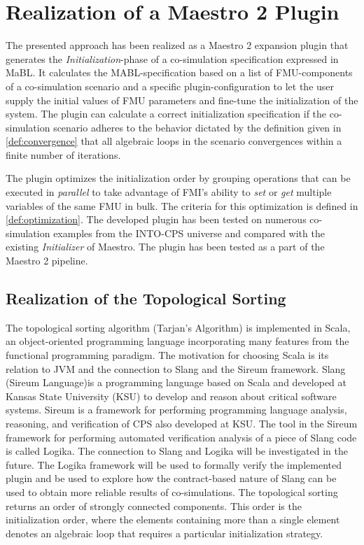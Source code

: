 \section{Realization of a Maestro 2 Plugin}\label{sc:implementation}
The presented approach has been realized as a Maestro 2 expansion plugin that generates the \textit{Initialization}-phase of a co-simulation specification expressed in MaBL. It calculates the MABL-specification based on a list of FMU-components of a co-simulation scenario and a specific plugin-configuration to let the user supply the initial values of  FMU parameters and fine-tune the initialization of the system. The plugin can calculate a correct initialization specification if the co-simulation scenario adheres to the behavior dictated by the definition given in \cref{def:convergence} that all algebraic loops in the scenario convergences within a finite number of iterations.

The plugin optimizes the initialization order by grouping operations that can be executed in \textit{parallel} to take advantage of FMI's ability to \textit{set} or \textit{get} multiple variables of the same FMU in bulk. The criteria for this optimization is defined in \cref{def:optimization}. 
The developed plugin has been tested on numerous co-simulation examples from the INTO-CPS universe\cite{Maestro} and compared with the existing \textit{Initializer} of Maestro. The plugin has been tested as a part of the Maestro 2 pipeline. 

\subsection{Realization of the Topological Sorting}
The topological sorting algorithm (Tarjan's Algorithm) is implemented in Scala\cite{Scala}, an object-oriented programming language incorporating many features from the functional programming paradigm. The motivation for choosing Scala is its relation to JVM and the connection to Slang and the Sireum framework\cite{inbook}. Slang (Sireum Language)is a programming language based on Scala and developed at Kansas State University (KSU) to develop and reason about critical software systems. Sireum is a framework for performing programming language analysis, reasoning, and verification of CPS also developed at KSU. The tool in the Sireum framework for performing automated verification analysis of a piece of Slang code is called Logika. 
The connection to Slang and Logika will be investigated in the future. The Logika framework will be used to formally verify the implemented plugin and be used to explore how the contract-based nature of Slang can be used to obtain more reliable results of co-simulations. The topological sorting returns an order of strongly connected components. This order is the initialization order, where the elements containing more than a single element denotes an algebraic loop that requires a particular initialization strategy. 

